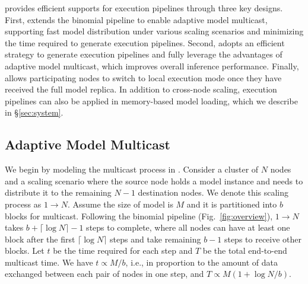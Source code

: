 \AlgoName provides efficient supports for execution pipelines through three key designs.
First, \AlgoName extends the binomial pipeline to enable adaptive model multicast, supporting fast model distribution under various scaling scenarios and minimizing the time required to generate execution pipelines. 
Second, \AlgoName adopts an efficient strategy to generate execution pipelines and fully leverage the advantages of adaptive model multicast, which improves overall inference performance.
Finally, \AlgoName allows participating nodes to switch to local execution mode once they have received the full model replica.
In addition to cross-node scaling, execution pipelines can also be applied in memory-based model loading, which we describe in \S\ref{sec:system}.

\subsection{Adaptive Model Multicast}
\label{subsec:model_multicast}

We begin by modeling the multicast process in \AlgoName.
Consider a cluster of $N$ nodes and a scaling scenario where the source node holds a model instance and needs to distribute it to the remaining $N - 1$ destination nodes.
We denote this scaling process as $1 \rightarrow N$.
Assume the size of model is $M$ and it is partitioned into $b$ blocks for multicast. 
Following the binomial pipeline (Fig.~\ref{fig:overview}), $1 \rightarrow N$ takes $b + \lceil \log N \rceil - 1$ steps to complete, where all nodes can have at least one block after the first $\lceil \log N \rceil$ steps and take remaining $b - 1$ steps to receive other blocks.
Let $t$ be the time required for each step and $T$ be the total end-to-end multicast time.
We have $t \propto M/b$, i.e., in proportion to the amount of data exchanged between each pair of nodes in one step, and $T \propto M (1 + \log N / b) $.

